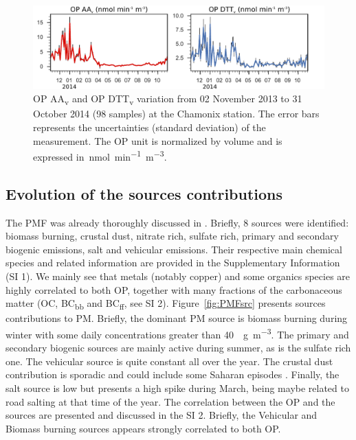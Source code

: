 \documentclass[acp, manuscript]{copernicus}
\begin{document}
\begin{figure}[h]
    \centering
    \includegraphics[width=\textwidth]{figures/fig02}
    \caption{OP AA\textsubscript{v} and OP DTT\textsubscript{v} variation from
        02 November 2013 to 31 October 2014 (98 samples) at the Chamonix station. The error
        bars represents the uncertainties (standard deviation) of the
        measurement. The OP unit is normalized by volume and is expressed
        in~\unit{nmol~min^{-1}~m^{-3}}.  }
    \label{fig:OPts}
\end{figure}

\subsection{Evolution of the sources contributions}\label{evolution-of-the-sources-contributions}

The PMF was already thoroughly discussed in \citet{chevrier_chauffage_2016}. Briefly, 8
sources were identified: biomass burning, crustal dust, nitrate rich,
sulfate rich, primary and secondary biogenic emissions, salt and
vehicular emissions. Their respective main chemical species and related
information are provided in the Supplementary Information (SI 1). We
mainly see that metals (notably copper) and some organics species are
highly correlated to both OP, together with many fractions of the
carbonaceous matter (OC, BC\textsubscript{bb} and BC\textsubscript{ff}, see SI 2).
Figure~\ref{fig:PMFsrc} presents sources contributions to PM. Briefly, the dominant PM
source is biomass burning during winter with some daily concentrations
greater than 40~\unit{\mu g~m^{-3}}. The primary and secondary
biogenic sources are mainly active during summer, as is the sulfate
rich one. The vehicular source is quite constant all over the year. The
crustal dust contribution is sporadic and could include some Saharan
episodes \citep{aymoz_evolution_2004}. Finally, the salt source is low but
presents a high spike during March, being maybe related to road salting
at that time of the year. The correlation between the OP and the sources
are presented and discussed in the SI 2. Briefly, the Vehicular and
Biomass burning sources appears strongly correlated to both OP.
\end{document}

